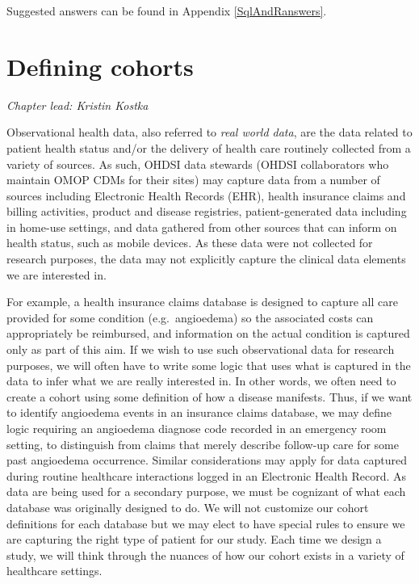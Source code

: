 \documentclass[11pt]{book}
\theoremstyle{definition}
\theoremstyle{definition}
\theoremstyle{definition}
\theoremstyle{remark}
\begin{document}
Suggested answers can be found in Appendix \ref{SqlAndRanswers}.

\hypertarget{Cohorts}{%
\chapter{Defining cohorts}\label{Cohorts}}

\emph{Chapter lead: Kristin Kostka}

Observational health data, also referred to \emph{real world data}, are the data related to patient health status and/or the delivery of health care routinely collected from a variety of sources. As such, OHDSI data stewards (OHDSI collaborators who maintain OMOP CDMs for their sites) may capture data from a number of sources including Electronic Health Records (EHR), health insurance claims and billing activities, product and disease registries, patient-generated data including in home-use settings, and data gathered from other sources that can inform on health status, such as mobile devices. As these data were not collected for research purposes, the data may not explicitly capture the clinical data elements we are interested in.

For example, a health insurance claims database is designed to capture all care provided for some condition (e.g.~angioedema) so the associated costs can appropriately be reimbursed, and information on the actual condition is captured only as part of this aim. If we wish to use such observational data for research purposes, we will often have to write some logic that uses what is captured in the data to infer what we are really interested in. In other words, we often need to create a cohort using some definition of how a disease manifests. Thus, if we want to identify angioedema events in an insurance claims database, we may define logic requiring an angioedema diagnose code recorded in an emergency room setting, to distinguish from claims that merely describe follow-up care for some past angioedema occurrence. Similar considerations may apply for data captured during routine healthcare interactions logged in an Electronic Health Record. As data are being used for a secondary purpose, we must be cognizant of what each database was originally designed to do. We will not customize our cohort definitions for each database but we may elect to have special rules to ensure we are capturing the right type of patient for our study. Each time we design a study, we will think through the nuances of how our cohort exists in a variety of healthcare settings.
\end{document}
